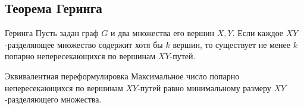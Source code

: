 \subsection{Теорема Геринга}

\begin{Theorem}{Геринга}{}
  Пусть задан граф $G$ и два множества его вершин $X, Y$.
  Если каждое $XY$-разделяющее множество содержит хотя бы $k$ вершин,
  то существует не менее $k$ попарно непересекающихся по вершинам
  $XY$-путей.
\end{Theorem}

\begin{Statement}{Эквивалентная переформулировка}{}
  Максимальное число попарно непересекающихся по вершинам $XY$-путей
  равно минимальному размеру $XY$-разделяющего множества.
\end{Statement}

